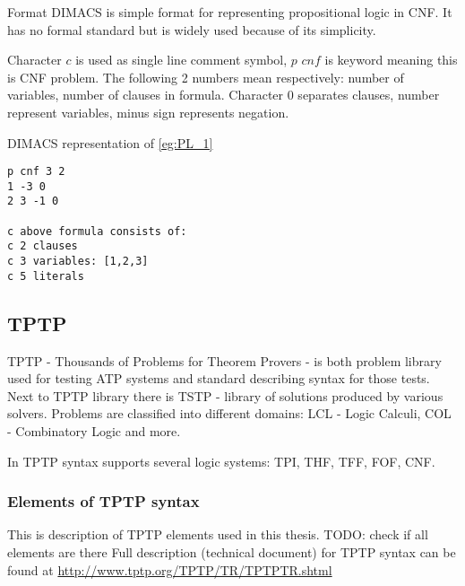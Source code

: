 Format DIMACS is simple format for representing propositional logic in \gls{CNF}. It has no formal standard but is widely used because of its simplicity.

Character $c$ is used as single line comment symbol, $p$ $cnf$ is keyword meaning this is \gls{CNF} problem. The following 2 numbers mean respectively: number of variables, number of clauses in formula.  Character $0$ separates clauses, number represent variables, minus sign represents negation.


\begin{listing}[H]
  \caption{DIMACS representation of \ref{eg:PL_1}}
  \begin{verbatim}
p cnf 3 2
1 -3 0
2 3 -1 0

c above formula consists of:
c 2 clauses
c 3 variables: [1,2,3]
c 5 literals
  \end{verbatim}
\end{listing}

\subsection{TPTP}

\gls{TPTP} \cite{Sut17} - Thousands of Problems for Theorem Provers - is both problem library used for testing \gls{ATP} systems and standard describing syntax for those tests. Next to TPTP library there is \gls{TSTP} - library of solutions produced by various solvers. Problems are classified into different domains: LCL - Logic Calculi, COL - Combinatory Logic and more.

In TPTP syntax supports several logic systems: \gls{TPI}, \gls{THF}, \gls{TFF}, \gls{FOF}, \gls{CNF}. 

\subsubsection{Elements of TPTP syntax}

This is description of TPTP elements used in this thesis. TODO: check if all elements are there
\newline
Full description (technical document) for TPTP syntax can be found at \url{http://www.tptp.org/TPTP/TR/TPTPTR.shtml}


